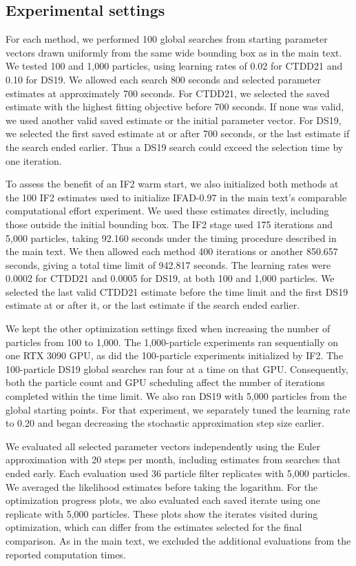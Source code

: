 \documentclass[11pt]{article}
\theoremstyle{thmstylethree}%
\begin{document}
\subsection{Experimental settings}

For each method, we performed 100 global searches from starting parameter
vectors drawn uniformly from the same wide bounding box as in the main
text. We tested 100 and 1,000 particles, using learning rates of 0.02 for
CTDD21 and 0.10 for DS19. We allowed each search 800 seconds and
selected parameter estimates at approximately 700 seconds. For CTDD21,
we selected the saved estimate with the highest fitting objective before
700 seconds. If none was valid, we used another valid saved estimate or
the initial parameter vector. For DS19, we selected the first saved
estimate at or after 700 seconds, or the last estimate if the search ended
earlier. Thus a DS19 search could exceed the selection time by one
iteration.

To assess the benefit of an IF2 warm start, we also initialized both
methods at the 100 IF2 estimates used to initialize IFAD-0.97 in the main
text's comparable computational effort experiment. We used these estimates
directly, including those outside the initial bounding box. The IF2 stage
used 175 iterations and 5,000 particles, taking 92.160 seconds under the
timing procedure described in the main text. We then allowed each method
400 iterations or another 850.657 seconds, giving a total time limit of
942.817 seconds. The learning rates were 0.0002 for CTDD21 and 0.0005
for DS19, at both 100 and 1,000 particles. We selected the last valid
CTDD21 estimate before the time limit and the first DS19 estimate
at or after it, or the last estimate if the search ended earlier.

We kept the other optimization settings fixed when increasing the number
of particles from 100 to 1,000. The 1,000-particle experiments ran
sequentially on one RTX 3090 GPU, as did the 100-particle experiments
initialized by IF2. The 100-particle DS19 global searches ran four at
a time on that GPU. Consequently, both the particle count and GPU
scheduling affect the number of iterations completed within the time limit.
We also ran DS19 with 5,000 particles from the global starting points.
For that experiment, we separately tuned the learning rate to 0.20 and
began decreasing the stochastic approximation step size earlier.

We evaluated all selected parameter vectors independently using the Euler
approximation with 20 steps per month, including estimates from searches
that ended early. Each evaluation used 36 particle filter replicates with
5,000 particles. We averaged the likelihood estimates before taking the
logarithm. For the optimization progress plots, we also evaluated each
saved iterate using one replicate with 5,000 particles. These plots show
the iterates visited during optimization, which can differ from the
estimates selected for the final comparison. As in the main text, we
excluded the additional evaluations from the reported computation times.
\end{document}
